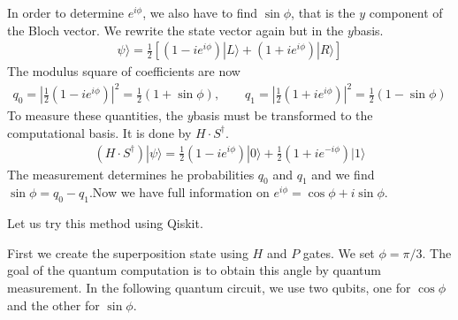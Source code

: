 \documentclass[letterpaper,10pt,english]{jupyterBook}
\begin{document}
\sphinxAtStartPar
In order to determine \(e^{i \phi}\), we also have to find \(\sin\phi\), that is the \(y\) component of the Bloch vector.  We rewrite the state vector again but in the \(y\)\sphinxhyphen{}basis.
\begin{equation*}
\begin{split}
\psi\rangle = \frac{1}{2} \left[ (1-i e^{i \phi}) |L \rangle + (1 + i e^{i \phi}) |R\rangle \right]
\end{split}
\end{equation*}
\sphinxAtStartPar
The modulus square of coefficients are now
\begin{equation*}
\begin{split}
q_0 = \left | \frac{1}{2} (1-i e^{i \phi}) \right |^2 =  \frac{1}{2}\left(1+\sin \phi\right), \qquad q_1 = \left | \frac{1}{2} (1+i e^{i \phi}) \right |^2 = \frac{1}{2}\left(1-\sin \phi\right)
\end{split}
\end{equation*}
\sphinxAtStartPar
To measure these quantities, the \(y\)\sphinxhyphen{}basis must be transformed to the computational basis. It is done by \(H \cdot S^\dagger\).
\begin{equation*}
\begin{split}
(H \cdot S^\dagger) |\psi\rangle = \frac{1}{2}\left(1- i e^{i \phi}\right) |0\rangle + \frac{1}{2}\left(1+ i e^{-i \phi}\right) |1\rangle
\end{split}
\end{equation*}
\sphinxAtStartPar
The measurement determines he probabilities \(q_0\) and \(q_1\) and we find \(\sin\phi = q_0 - q_1\).Now we have full information on \(e^{i \phi} = \cos\phi + i \sin\phi\).

\sphinxAtStartPar
Let us try this method using Qiskit.

\sphinxAtStartPar
First we create the superposition state using \(H\) and \(P\) gates.  We set \(\phi=\pi/3\).  The goal of the quantum computation is to obtain this angle by quantum measurement.  In the following quantum circuit, we use two qubits, one for \(\cos\phi\) and the other for \(\sin\phi\).
\end{document}
